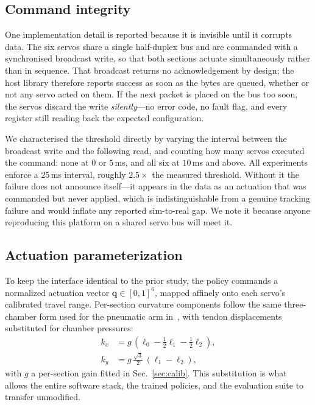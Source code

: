 \documentclass[letterpaper, 10pt, conference]{ieeeconf}
\begin{document}
\subsection{Command integrity}

One implementation detail is reported because it is invisible until it
corrupts data. The six servos share a single half-duplex bus and are
commanded with a synchronised broadcast write, so that both sections actuate
simultaneously rather than in sequence. That broadcast returns no
acknowledgement by design; the host library therefore reports success as soon
as the bytes are queued, whether or not any servo acted on them. If the next
packet is placed on the bus too soon, the servos discard the write
\emph{silently}---no error code, no fault flag, and every register still
reading back the expected configuration.

We characterised the threshold directly by varying the interval between the
broadcast write and the following read, and counting how many servos executed
the command: none at $0$ or $5\,$ms, and all six at $10\,$ms and above. All
experiments enforce a $25\,$ms interval, roughly $2.5\times$ the measured
threshold. Without it the failure does not announce itself---it appears in the
data as an actuation that was commanded but never applied, which is
indistinguishable from a genuine tracking failure and would inflate any
reported sim-to-real gap. We note it because anyone reproducing this platform
on a shared servo bus will meet it.

\subsection{Actuation parameterization}

To keep the interface identical to the prior study, the policy commands a
normalized actuation vector $\mathbf{q}\in[0,1]^{6}$, mapped affinely onto
each servo's calibrated travel range. Per-section curvature components follow
the same three-chamber form used for the pneumatic arm
in~\cite{prior}, with tendon displacements substituted for chamber pressures:
\begin{align}
k_x &= g\,(\ell_0 - \tfrac{1}{2}\ell_1 - \tfrac{1}{2}\ell_2), \\
k_y &= g\,\tfrac{\sqrt{3}}{2}\,(\ell_1 - \ell_2),
\end{align}
with $g$ a per-section gain fitted in Sec.~\ref{sec:calib}. This substitution
is what allows the entire software stack, the trained policies, and the
evaluation suite to transfer unmodified.
\end{document}
